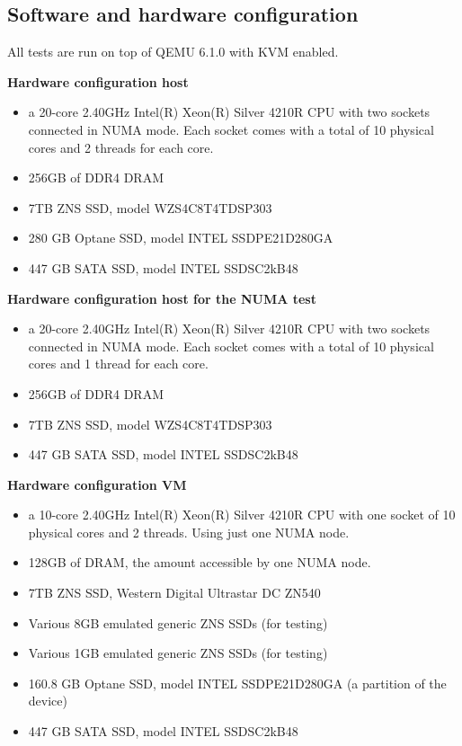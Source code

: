 \subsection{Software and hardware configuration}
All tests are run on top of QEMU 6.1.0 with KVM enabled.

\textbf{Hardware configuration host}
\begin{itemize}
    \item a 20-core 2.40GHz Intel(R) Xeon(R) Silver 4210R CPU with two sockets connected in NUMA mode. Each socket comes with a total of 10 physical cores and 2 threads for each core.
    \item 256GB of DDR4 DRAM
    \item 7TB ZNS SSD, model WZS4C8T4TDSP303
    \item 280 GB Optane SSD, model INTEL SSDPE21D280GA
    \item 447 GB SATA SSD, model INTEL SSDSC2kB48
\end{itemize}

\textbf{Hardware configuration host for the NUMA test}
\begin{itemize}
    \item a 20-core 2.40GHz Intel(R) Xeon(R) Silver 4210R CPU with two sockets connected in NUMA mode. Each socket comes with a total of 10 physical cores and 1 thread for each core.
    \item 256GB of DDR4 DRAM
    \item 7TB ZNS SSD, model WZS4C8T4TDSP303
    \item 447 GB SATA SSD, model INTEL SSDSC2kB48
\end{itemize}

\textbf{Hardware configuration VM}
\begin{itemize}
    \item a 10-core 2.40GHz Intel(R) Xeon(R) Silver 4210R CPU with one socket of 10 physical cores and 2 threads. Using just one NUMA node.
    \item 128GB of DRAM, the amount accessible by one NUMA node.
    \item 7TB ZNS SSD, Western Digital Ultrastar DC ZN540
    \item Various 8GB emulated generic ZNS SSDs (for testing)
    \item Various 1GB emulated generic ZNS SSDs (for testing)
    \item 160.8 GB Optane SSD, model INTEL SSDPE21D280GA (a partition of the device)
    \item 447 GB SATA SSD, model INTEL SSDSC2kB48
\end{itemize}

